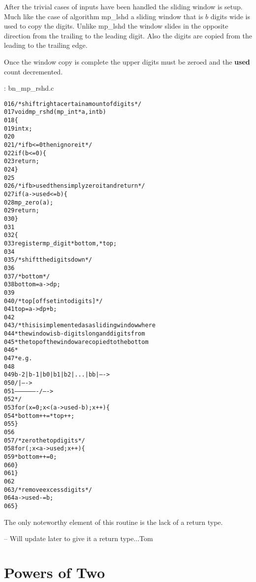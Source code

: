 \documentclass[b5paper]{book}
\begin{document}
After the trivial cases of inputs have been handled the sliding window is setup.  Much like the case of algorithm mp\_lshd a sliding window that
is $b$ digits wide is used to copy the digits.  Unlike mp\_lshd the window slides in the opposite direction from the trailing to the leading digit.  
Also the digits are copied from the leading to the trailing edge.

Once the window copy is complete the upper digits must be zeroed and the \textbf{used} count decremented.

\vspace{+3mm}\begin{small}
\hspace{-5.1mm}{\bf File}: bn\_mp\_rshd.c
\vspace{-3mm}
\begin{alltt}
016   /* shift right a certain amount of digits */
017   void mp_rshd (mp_int * a, int b)
018   \{
019     int     x;
020   
021     /* if b <= 0 then ignore it */
022     if (b <= 0) \{
023       return;
024     \}
025   
026     /* if b > used then simply zero it and return */
027     if (a->used <= b) \{
028       mp_zero (a);
029       return;
030     \}
031   
032     \{
033       register mp_digit *bottom, *top;
034   
035       /* shift the digits down */
036   
037       /* bottom */
038       bottom = a->dp;
039   
040       /* top [offset into digits] */
041       top = a->dp + b;
042   
043       /* this is implemented as a sliding window where 
044        * the window is b-digits long and digits from 
045        * the top of the window are copied to the bottom
046        *
047        * e.g.
048   
049        b-2 | b-1 | b0 | b1 | b2 | ... | bb |   ---->
050                    /                   |      ---->
051                     -------------------/      ---->
052        */
053       for (x = 0; x < (a->used - b); x++) \{
054         *bottom++ = *top++;
055       \}
056   
057       /* zero the top digits */
058       for (; x < a->used; x++) \{
059         *bottom++ = 0;
060       \}
061     \}
062     
063     /* remove excess digits */
064     a->used -= b;
065   \}
\end{alltt}
\end{small}

The only noteworthy element of this routine is the lack of a return type.  

-- Will update later to give it a return type...Tom

\section{Powers of Two}
\end{document}
